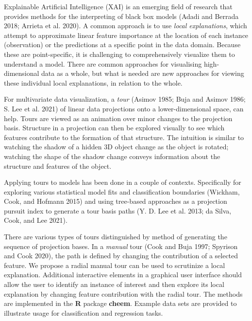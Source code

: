 \documentclass[11pt,twoside]{article}
\begin{document}
Explainable Artificial Intelligence (XAI) is an emerging field of research that provides methods for the interpreting of black box models (Adadi and Berrada 2018; Arrieta et al. 2020). A common approach is to use \emph{local explanations}, which attempt to approximate linear feature importance at the location of each instance (observation) or the predictions at a specific point in the data domain. Because these are point-specific, it is challenging to comprehensively visualize them to understand a model. There are common approaches for visualising high-dimensional data as a whole, but what is needed are new approaches for viewing these individual local explanations, in relation to the whole.

For multivariate data visualization, a \emph{tour} (Asimov 1985; Buja and Asimov 1986; S. Lee et al. 2021) of linear data projections onto a lower-dimensional space, can help. Tours are viewed as an animation over minor changes to the projection basis. Structure in a projection can then be explored visually to see which features contribute to the formation of that structure. The intuition is similar to watching the shadow of a hidden 3D object change as the object is rotated; watching the shape of the shadow change conveys information about the structure and features of the object.

Applying tours to models has been done in a couple of contexts. Specifically for exploring various statistical model fits and classification boundaries (Wickham, Cook, and Hofmann 2015) and using tree-based approaches as a projection pursuit index to generate a tour basis paths (Y. D. Lee et al. 2013; da Silva, Cook, and Lee 2021).

There are various types of tours distinguished by method of generating the sequence of projection bases. In a \emph{manual} tour (Cook and Buja 1997; Spyrison and Cook 2020), the path is defined by changing the contribution of a selected feature. We propose a radial manual tour can be used to scrutinize a local explanation. Additional interactive elements in a graphical user interface should allow the user to identify an instance of interest and then explore its local explanation by changing feature contribution with the radial tour. The methods are implemented in the \textbf{R} package \textbf{cheem}. Example data sets are provided to illustrate usage for classification and regression tasks.
\end{document}
